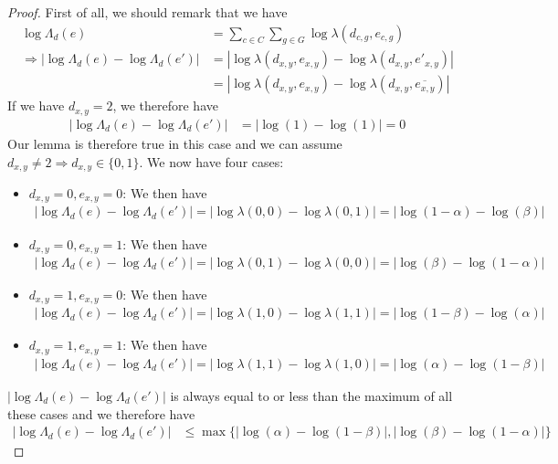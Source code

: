 \begin{proof}
    First of all, we should remark that we have
    \begin{align*}
        \log\Lambda_d(e) &= \sum_{c \in C} \sum_{g \in G} \log\lambda(d_{c,g}, e_{c,g}) \\
        \Rightarrow |\log\Lambda_d(e) - \log\Lambda_d(e')| &= |\log\lambda(d_{x,y}, e_{x,y}) - \log\lambda(d_{x,y}, e'_{x,y})| \\
        &= |\log\lambda(d_{x,y}, e_{x,y}) - \log\lambda(d_{x,y}, \overline{e_{x,y}})|
    \end{align*}
    If we have $d_{x,y} = 2$, we therefore have
    \begin{align*}
        |\log\Lambda_d(e) - \log\Lambda_d(e')| &= |\log(1) - \log(1)| = 0
    \end{align*}
    Our lemma is therefore true in this case and we can assume $d_{x,y} \neq 2 \Rightarrow d_{x,y} \in \{0,1\}$. We now have four cases:
    \begin{itemize}
        \item $d_{x,y} = 0, e_{x,y} = 0$: We then have
        \begin{align*}
            |\log\Lambda_d(e) - \log\Lambda_d(e')| = |\log\lambda(0,0) - \log\lambda(0,1)| = |\log(1-\alpha) - \log(\beta)|
        \end{align*}
        \item $d_{x,y} = 0, e_{x,y} = 1$: We then have
        \begin{align*}
            |\log\Lambda_d(e) - \log\Lambda_d(e')| = |\log\lambda(0,1) - \log\lambda(0,0)| = |\log(\beta) - \log(1-\alpha)|
        \end{align*}
        \item $d_{x,y} = 1, e_{x,y} = 0$: We then have
        \begin{align*}
            |\log\Lambda_d(e) - \log\Lambda_d(e')| = |\log\lambda(1,0) - \log\lambda(1,1)| = |\log(1-\beta) - \log(\alpha)|
        \end{align*}
        \item $d_{x,y} = 1, e_{x,y} = 1$: We then have
        \begin{align*}
            |\log\Lambda_d(e) - \log\Lambda_d(e')| = |\log\lambda(1,1) - \log\lambda(1,0)| = |\log(\alpha) - \log(1-\beta)|
        \end{align*}
    \end{itemize}
    $|\log\Lambda_d(e) - \log\Lambda_d(e')|$ is always equal to or less than the maximum of all these cases and we therefore have
    \begin{align*}
        |\log\Lambda_d(e) - \log\Lambda_d(e')| &\leq \max\{|\log(\alpha) - \log(1-\beta)|, |\log(\beta) - \log(1-\alpha)|\}
    \end{align*}
\end{proof}

